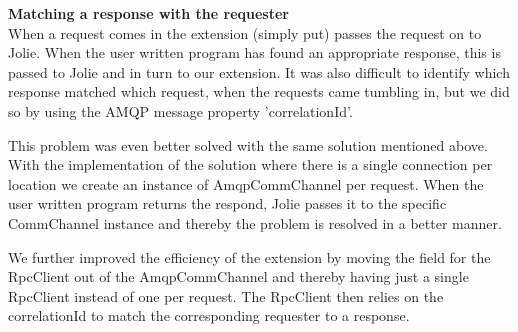 \noindent\textbf{Matching a response with the requester}\\
When a request comes in the extension (simply put) passes the request on to Jolie. When the user written program has found an appropriate response, this is passed to Jolie and in turn to our extension. It was also difficult to identify which response matched which request, when the requests came tumbling in, but we did so by using the AMQP message property 'correlationId'.

This problem was even better solved with the same solution mentioned above. With the implementation of the solution where there is a single connection per location we create an instance of AmqpCommChannel per request. When the user written program returns the respond, Jolie passes it to the specific CommChannel instance and thereby the problem is resolved in a better manner.

We further improved the efficiency of the extension by moving the field for the RpcClient out of the AmqpCommChannel and thereby having just a single RpcClient instead of one per request. The RpcClient then relies on the correlationId to match the corresponding requester to a response.
\newpage